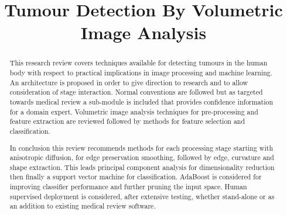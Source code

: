 \documentclass[journal]{IEEEtran}
\begin{document}
\title{Tumour Detection By Volumetric Image Analysis}
\author{
}


{}

\maketitle





\begin{abstract}

This research review covers techniques available for detecting tumours in the human body with respect to practical implications in image processing and machine learning.   
An architecture is proposed in order to give direction to research and to allow consideration of stage interaction.
Normal conventions are followed but as targeted towards medical review a sub-module is included that provides confidence information for a domain expert.  
Volumetric image analysis techniques for pre-processing and feature extraction are reviewed followed by methods for feature selection and classification. 
 

In conclusion this review recommends methods for each processing stage starting with anisotropic diffusion, for edge preservation smoothing, followed by edge, curvature and shape extraction.
This leads principal component analysis for dimensionality reduction then finally a support vector machine for classification.
AdaBoost is considered for improving classifier performance and further pruning the input space.
Human supervised deployment is considered, after extensive testing, whether stand-alone or as an addition to existing medical review software.

\end{abstract}










\IEEEpeerreviewmaketitle
\end{document}

